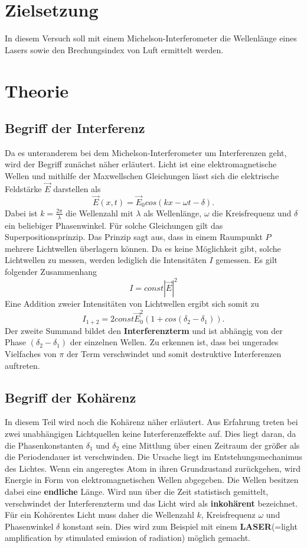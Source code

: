 \section{Zielsetzung}
In diesem Versuch soll mit einem Michelson-Interferometer
die Wellenlänge eines Lasers sowie den Brechungsindex von Luft
ermittelt werden.
\section{Theorie}
\subsection{Begriff der Interferenz}
Da es unteranderem bei dem Michelson-Interferometer um Interferenzen geht,
wird der Begriff zunächst näher erläutert.
Licht ist eine elektromagnetische Wellen und mithilfe der Maxwellschen Gleichungen
lässt sich die elektrische Feldstärke $\vec{E}$ darstellen als
\begin{equation*}
  \vec{E}(x,t) = \vec{E}_0 cos(kx-\omega t - \delta).
\end{equation*}
Dabei ist $k = \frac{2\pi}{\lambda}$ die Wellenzahl mit $\lambda$ als Wellenlänge, $\omega$ die Kreisfrequenz
und $\delta$ ein beliebiger Phasenwinkel. Für solche Gleichungen gilt das Superpositionsprinzip.
Das Prinzip sagt aus, dass in einem Raumpunkt $P$ mehrere Lichtwellen überlagern können. Da es keine Möglichkeit gibt,
solche Lichtwellen zu messen, werden lediglich die Intensitäten $I$ gemessen. Es gilt folgender Zusammenhang
\begin{equation*}
  I = const |\vec{E}|^2
\end{equation*}
Eine Addition zweier Intensitäten von Lichtwellen ergibt sich somit zu
\begin{equation*}
  I_{1+2} = 2const\vec{E}^2_0 (1+cos(\delta_2 - \delta_1)).
\end{equation*}
Der zweite Summand bildet den \textbf{Interferenzterm} und ist abhängig von der Phase $(\delta_2 - \delta_1)$
der einzelnen Wellen. Zu erkennen ist, dass bei ungerades Vielfaches von $\pi$ der Term verschwindet und somit destruktive
Interferenzen auftreten.
\subsection{Begriff der Kohärenz}
In diesem Teil wird noch die Kohärenz näher erläutert. Aus Erfahrung treten bei zwei unabhängigen Lichtquellen
keine Interferenzeffekte auf. Dies liegt daran, da die Phasenkonstanten $\delta_1$ und $\delta_2$ eine Mittlung über einen
Zeitraum der größer als die Periodendauer ist verschwinden. Die Ursache liegt im Entstehungsmechanimus des Lichtes.
Wenn ein angeregtes Atom in ihren Grundzustand zurückgehen, wird Energie in Form von elektromagnetischen Wellen abgegeben.
Die Wellen besitzen dabei eine \textbf{endliche} Länge. Wird nun über die Zeit statistisch gemittelt, verschwindet der Interferenzterm und
das Licht wird als \textbf{inkohärent} bezeichnet.
Für ein Kohörentes Licht muss daher die Wellenzahl $k$, Kreisfrequenz $\omega$ und Phasenwinkel $\delta$ konstant sein.
Dies wird zum Beispiel mit einem \textbf{LASER}(=light amplification by stimulated emission of radiation) möglich gemacht.
